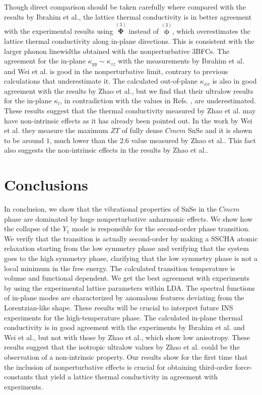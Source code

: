 Though direct comparison should be taken carefully where compared with the results by Ibrahim et 
al.\cite{ibrahim2017reinvestigation}, the lattice 
thermal conductivity is in better agreement with the experimental results using $\overset{(3)}{\boldsymbol{\Phi}}$ 
instead of $\overset{(3)}{\boldsymbol{\phi}}$, which overestimates the lattice thermal conductivity along 
in-plane directions. This is consistent with the larger phonon linewidths obtained with the nonperturbative 3BFCs. 
The agreement for the in-plane $\kappa_{yy} \sim \kappa_{zz}$ with the measurements by Ibrahim et al.\cite{ibrahim2017reinvestigation} and Wei et al.\cite{wei2019thermoelectric} is good in the nonperturbative limit, contrary to 
previous calculations that underestimate it\cite{skelton2016anharmonicity}. The calculated out-of-plane $\kappa_{xx}$ 
is also in good agreement with the results by Zhao et al.\cite{zhao2014ultralow}, but we find that their ultralow 
results for the in-plane $\kappa_l$, in contradiction with the values in Refs. 
\cite{ibrahim2017reinvestigation,wei2019thermoelectric}, are underestimated. These results suggest that the thermal 
conductivity measured by Zhao et al. may have non-intrinsic effects as it has already been pointed out\cite{wei2016intrinsic}. In the work by Wei et al. they measure the maximum $ZT$ of fully dense $Cmcm$ SnSe and it is shown to be 
around $1$, much lower than the $2.6$ value measured by Zhao et al.\cite{zhao2014ultralow}. This fact also suggests 
the non-intrinsic effects in the results by Zhao et al.\cite{zhao2014ultralow}.

\section{Conclusions}

In conclusion, we show that the vibrational properties of SnSe in the $Cmcm$ phase are dominated by huge nonperturbative anharmonic effects. We show how the collapse of the $Y_1$ mode is responsible for the second-order 
phase transition. We verify that the transition is actually second-order by making a SSCHA atomic relaxation starting from the low symmetry phase and verifying that the system goes to the high symmetry phase, clarifying that the low symmetry phase is not a local minimum in the free energy. The calculated transition temperature is volume and functional dependent. We get the best agreement with experiments by using the experimental lattice parameters within LDA. The spectral functions of in-plane modes are characterized by anomalous features deviating from the Lorentzian-like shape. These results will be crucial to interpret future INS experiments for the high-temperature phase. The calculated in-plane thermal conductivity is in good agreement with the experiments by Ibrahim et al.\cite{ibrahim2017reinvestigation} and Wei et al.\cite{wei2019thermoelectric}, but not with those by Zhao et al.\cite{zhao2014ultralow}, which show low anisotropy. These results suggest that the isotropic ultralow values by Zhao et al. could be the observation of a non-intrinsic property. Our results show for the first time that the inclusion of nonperturbative effects is crucial for obtaining third-order force-constants that yield a lattice thermal conductivity in agreement with experiments.
